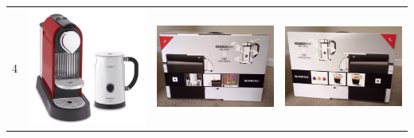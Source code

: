 \begin{longtable}{| l | l | l | l |}
	\multirow{6}{*}{4} & \includegraphics[scale=0.25]{images/ground_truth/4/image_1} & \includegraphics[scale=0.25]{images/ground_truth/4/image_2} & \includegraphics[scale=0.25]{images/ground_truth/4/image_3} \\

\end{longtable}
